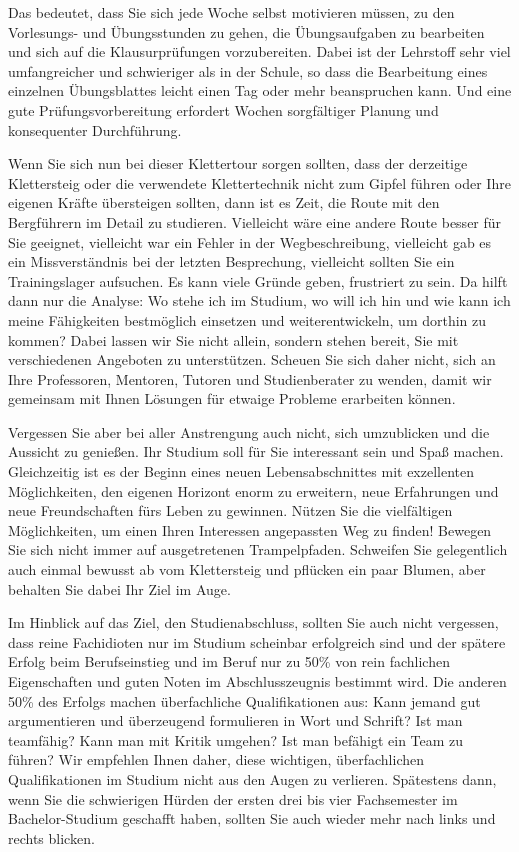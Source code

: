 {Das bedeutet, dass Sie sich jede Woche selbst motivieren müssen, zu den Vorlesungs- und Übungsstunden zu gehen, die Übungsaufgaben zu bearbeiten und sich auf die Klausurprüfungen vorzubereiten. Dabei ist der Lehrstoff sehr viel umfangreicher und schwieriger als in der Schule, so dass die Bearbeitung eines einzelnen Übungsblattes leicht einen Tag oder mehr beanspruchen kann. Und eine gute Prüfungsvorbereitung erfordert Wochen sorgfältiger Planung und konsequenter Durchführung. 

Wenn Sie sich nun bei dieser Klettertour sorgen sollten, dass der derzeitige Klettersteig oder die verwendete Klettertechnik nicht zum Gipfel führen oder Ihre eigenen Kräfte übersteigen sollten, dann ist es Zeit, die Route mit den Bergführern im Detail zu studieren. Vielleicht wäre eine andere Route besser für Sie geeignet, vielleicht war ein Fehler in der Wegbeschreibung, vielleicht gab es ein Missverständnis bei der letzten Besprechung, vielleicht sollten Sie ein Trainingslager aufsuchen. Es kann viele Gründe geben, frustriert zu sein. Da hilft dann nur die Analyse: Wo stehe ich im Studium, wo will ich hin und wie kann ich meine Fähigkeiten bestmöglich einsetzen und weiterentwickeln, um dorthin zu kommen? Dabei lassen wir Sie nicht allein, sondern stehen bereit, Sie mit verschiedenen Angeboten zu unterstützen. Scheuen Sie sich daher nicht, sich an Ihre Professoren, Mentoren, Tutoren und Studienberater zu wenden, damit wir gemeinsam mit Ihnen Lösungen für etwaige Probleme erarbeiten können.


Vergessen Sie aber bei aller Anstrengung auch nicht, sich umzublicken und die Aussicht zu genießen. Ihr Studium soll für Sie interessant sein und Spaß machen. Gleichzeitig ist es der Beginn eines neuen Lebensabschnittes mit exzellenten Möglichkeiten, den eigenen Horizont enorm zu erweitern, neue Erfahrungen und neue Freundschaften fürs Leben zu gewinnen. Nützen Sie die vielfältigen Möglichkeiten, um einen Ihren Interessen angepassten Weg zu finden! Bewegen Sie sich nicht immer auf ausgetretenen Trampelpfaden. Schweifen Sie gelegentlich auch einmal bewusst ab vom Klettersteig und pflücken ein paar Blumen, aber behalten Sie dabei Ihr Ziel im Auge.

Im Hinblick auf das Ziel, den Studienabschluss, sollten Sie auch nicht vergessen, dass reine Fachidioten nur im Studium scheinbar erfolgreich sind und der spätere Erfolg beim Berufseinstieg und im Beruf nur zu 50\% von rein fachlichen Eigenschaften und guten Noten im Abschlusszeugnis bestimmt wird. Die anderen 50\% des Erfolgs machen überfachliche Qualifikationen aus: Kann jemand gut argumentieren und überzeugend formulieren in Wort und Schrift? Ist man teamfähig? Kann man mit Kritik umgehen? Ist man befähigt ein Team zu führen? Wir empfehlen Ihnen daher, diese wichtigen, überfachlichen Qualifikationen im Studium nicht aus den Augen zu verlieren. Spätestens dann, wenn Sie die schwierigen Hürden der ersten drei bis vier Fachsemester im Bachelor-Studium geschafft haben, sollten Sie auch wieder mehr nach links und rechts blicken.

}
